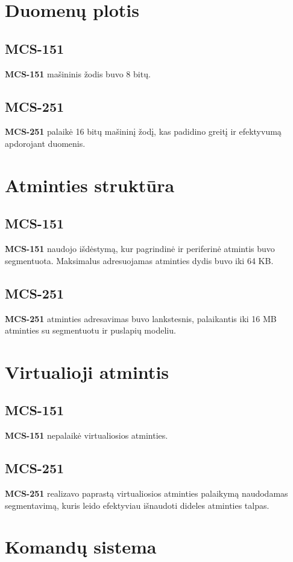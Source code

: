 \documentclass[a4paper,12pt]{article}
\begin{document}
 
\section{Duomenų plotis}
\subsection{MCS-151}
\textbf{MCS-151} mašininis žodis buvo 8 bitų.

\subsection{MCS-251}
\textbf{MCS-251} palaikė 16 bitų mašininį žodį, kas padidino greitį ir efektyvumą apdorojant duomenis.
 
\section{Atminties struktūra}
\subsection{MCS-151}
\textbf{MCS-151} naudojo išdėstymą, kur pagrindinė ir periferinė atmintis buvo segmentuota. Maksimalus adresuojamas atminties dydis buvo iki 64 KB.

\subsection{MCS-251}
\textbf{MCS-251} atminties adresavimas buvo lankstesnis, palaikantis iki 16 MB atminties su segmentuotu ir puslapių modeliu.

\newpage
 
\section{Virtualioji atmintis}
\subsection{MCS-151}
\textbf{MCS-151} nepalaikė virtualiosios atminties.

\subsection{MCS-251}
\textbf{MCS-251} realizavo paprastą virtualiosios atminties palaikymą naudodamas segmentavimą, kuris leido efektyviau išnaudoti dideles atminties talpas.

 
\section{Komandų sistema}
\end{document}
